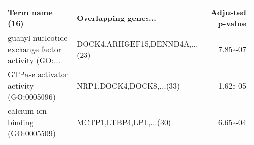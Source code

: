 \begin{tabular}{llr}
\toprule
                                    Term name (16) &           Overlapping genes... &  Adjusted p-value \\
\midrule
guanyl-nucleotide exchange factor activity (GO:... & DOCK4,ARHGEF15,DENND4A,...(23) &          7.85e-07 \\
            GTPase activator activity (GO:0005096) &       NRP1,DOCK4,DOCK8,...(33) &          1.62e-05 \\
                  calcium ion binding (GO:0005509) &        MCTP1,LTBP4,LPL,...(30) &          6.65e-04 \\
\bottomrule
\end{tabular}

